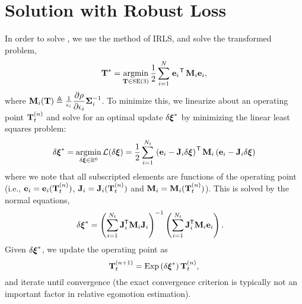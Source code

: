 \section{Solution with Robust Loss}

In order to solve , we use the method of IRLS, and solve the transformed problem,
\begin{equation}
\boldsymbol{\mathbf{T}}^* = \operatorname*{argmin}_{\boldsymbol{\mathbf{T}}\in\text{SE}(3)}\frac{1}{2} \sum_{i=1}^{N} 
\left.{\boldsymbol{\mathbf{e}}_{i}}\right.^{\mkern-1.0mu\mathsf{T}} \boldsymbol{\mathbf{M}}_{i} \boldsymbol{\mathbf{e}}_{i},
\end{equation}
where $ \boldsymbol{\mathbf{M}}_i(\boldsymbol{\mathbf{T}}) \triangleq \frac{1}{\epsilon_i} \dfrac{\partial \rho}{\partial \epsilon_i}  \boldsymbol{\mathbf{\Sigma}}_{i}^{-1}$.
To minimize this, we linearize about an operating point $\boldsymbol{\mathbf{T}}_t^{(n)}$ and solve for an optimal update $\delta \boldsymbol{\mathbf{\xi}}^*$ by minimizing the linear least squares problem:
\begin{equation}
\label{eq:appendix_vo_lls}
 \delta \Vector{\xi}^* = \ArgMin{\delta \Vector{\xi} \in \RealNumbers{}^6} \mathcal{L}(\delta \Vector{\xi}) = \frac{1}{2}\sum_{i=1}^{N_t} 
  \Transpose{\left(\Vector{e}_{i}
  - \Matrix J_{i} \delta\Vector{\xi}\right)}
\Matrix{M}_i
 \left(\Vector{e}_{i}
 - \Matrix J_{i} \delta\Vector{\xi}\right)
  \end{equation}
where we note that all subscripted elements are functions of the operating point (i.e., $\boldsymbol{\mathbf{e}}_{i} = \boldsymbol{\mathbf{e}}_{i}(\boldsymbol{\mathbf{T}}_t^{(n)})$, $\boldsymbol{\mathbf{J}}_{i} = \boldsymbol{\mathbf{J}}_{i}(\boldsymbol{\mathbf{T}}_t^{(n)})$ and $\boldsymbol{\mathbf{M}}_{i} = \boldsymbol{\mathbf{M}}_{i}(\boldsymbol{\mathbf{T}}_t^{(n)})$). This is solved by the normal equations,
\begin{align}
\label{eq:vo_appendix_irls_normal}
\delta\boldsymbol{\mathbf{\xi}}^* &= \left( \sum_{i=1}^{N_t} \boldsymbol{\mathbf{J}}_{i}^{\mkern-1.0mu\mathsf{T}} \boldsymbol{\mathbf{M}}_i \boldsymbol{\mathbf{J}}_{i} \right)^{-1} \left( \sum_{i=1}^{N_t} \boldsymbol{\mathbf{J}}_{i}^{\mkern-1.0mu\mathsf{T}}\boldsymbol{\mathbf{M}}_i \boldsymbol{\mathbf{e}}_i \right).
\end{align}
Given $\delta\boldsymbol{\mathbf{\xi}}^*$, we update the operating point as
\begin{equation}
	  \boldsymbol{\mathbf{T}}_t^{(n+1)} = \mathrm{Exp}\left({\delta\boldsymbol{\mathbf{\xi}}^*}\right) \boldsymbol{\mathbf{T}}_t^{(n)}, 
\end{equation}
and iterate until convergence (the exact convergence criterion is typically not an important factor in relative egomotion estimation).

